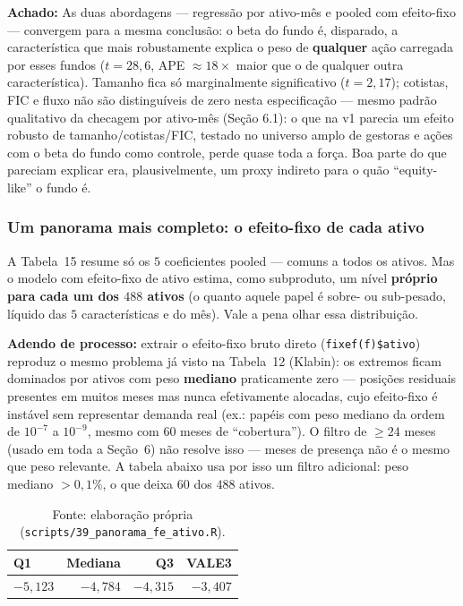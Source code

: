 \documentclass[11pt,a4paper]{article}
\newcommand{\aha}[1]{\par\vspace{4pt}\noindent\textbf{\color{vermelho}Achado:} #1\par\vspace{2pt}}
\begin{document}
\aha{As duas abordagens --- regressão por ativo-mês e pooled com efeito-fixo --- convergem para
a mesma conclusão: o beta do fundo é, disparado, a característica que mais robustamente explica
o peso de \textbf{qualquer} ação carregada por esses fundos ($t=28{,}6$, APE $\approx18\times$
maior que o de qualquer outra característica). Tamanho fica só marginalmente significativo
($t=2{,}17$); cotistas, FIC e fluxo não são distinguíveis de zero nesta especificação --- mesmo
padrão qualitativo da checagem por ativo-mês (Seção 6.1): o que na v1 parecia um efeito robusto
de tamanho/cotistas/FIC, testado no universo amplo de gestoras e ações com o beta do fundo como
controle, perde quase toda a força. Boa parte do que pareciam explicar era, plausivelmente, um
proxy indireto para o quão ``equity-like'' o fundo é.}

\subsubsection*{Um panorama mais completo: o efeito-fixo de cada ativo}

A Tabela~15 resume só os $5$ coeficientes pooled --- comuns a todos os ativos. Mas o modelo com
efeito-fixo de ativo estima, como subproduto, um nível \textbf{próprio para cada um dos $488$
ativos} (o quanto aquele papel é sobre- ou sub-pesado, líquido das $5$ características e do mês).
Vale a pena olhar essa distribuição.

\textbf{Adendo de processo:} extrair o efeito-fixo bruto direto (\texttt{fixef(f)\$ativo}) reproduz
o mesmo problema já visto na Tabela~12 (Klabin): os extremos ficam dominados por ativos com peso
\textbf{mediano} praticamente zero --- posições residuais presentes em muitos meses mas nunca
efetivamente alocadas, cujo efeito-fixo é instável sem representar demanda real (ex.: papéis com
peso mediano da ordem de $10^{-7}$ a $10^{-9}$, mesmo com $60$ meses de ``cobertura''). O filtro de
$\geq24$ meses (usado em toda a Seção~6) não resolve isso --- meses de presença não é o mesmo que
peso relevante. A tabela abaixo usa por isso um filtro adicional: peso mediano $>0{,}1\%$, o que
deixa $60$ dos $488$ ativos.

\begin{table}[h]\centering\small
\caption{Distribuição do efeito-fixo de ativo (log-odds, escala do modelo pooled) entre os 60
ativos com posição relevante ($\geq24$ meses e peso mediano $>0{,}1\%$).}
\begin{tabular}{@{}lrrr@{}}
\toprule
Q1 & Mediana & Q3 & VALE3 \\
\midrule
$-5{,}123$ & $-4{,}784$ & $-4{,}315$ & $-3{,}407$ \\
\bottomrule
\end{tabular}
\caption*{\footnotesize Fonte: elaboração própria (\texttt{scripts/39\_panorama\_fe\_ativo.R}).}
\end{table}
\end{document}
